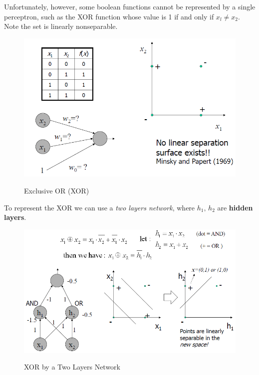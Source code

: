 \documentclass[../main.tex]{subfiles}
\begin{document}
Unfortunately, however, some boolean functions cannot be represented by a single perceptron, such as the XOR function whose value is 1 if and only if $x_l \neq x_2$. Note the set is linearly nonseparable.
\begin{figure}[H]
    \centering
    \includegraphics[scale = 0.6]{lectures/4_neural_networks/4_onelayer_xor.png}
    \label{fig:onelayer_xor}
    \caption{Exclusive OR (XOR)}
\end{figure}
\noindent To represent the XOR we can use a \emph{two layers network}, where $h_1,\, h_2$ are \textbf{hidden layers}.
\begin{figure}[H]
    \centering
    \includegraphics[scale = 0.6]{lectures/4_neural_networks/4_xor_two.png}
    \label{fig:xor_two}
    \caption{XOR by a Two Layers Network}
\end{figure}
\end{document}
